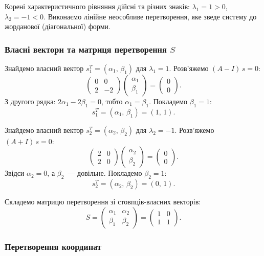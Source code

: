 \documentclass[12pt,a4paper]{article}
\begin{document}
Корені характеристичного рівняння дійсні та різних знаків: $\lambda_1 = 1 > 0$, $\lambda_2 = -1 < 0$. Виконаємо лінійне неособливе перетворення, яке зведе систему до жорданової (діагональної) форми.

\subsubsection{Власні вектори та матриця перетворення $S$}

Знайдемо власний вектор $s_1^T = (\alpha_1,\,\beta_1)$ для $\lambda_1 = 1$. Розв'яжемо $(A - I)\,s = 0$:
\[
\begin{pmatrix}
0 & 0\\
2 & -2
\end{pmatrix}
\begin{pmatrix}
\alpha_1\\\beta_1
\end{pmatrix}
=
\begin{pmatrix}
0\\0
\end{pmatrix}.
\]
З другого рядка: $2\alpha_1 - 2\beta_1 = 0$, тобто $\alpha_1 = \beta_1$. Покладемо $\beta_1 = 1$:
\[
s_1^T = (\alpha_1,\,\beta_1) = (1,\,1).
\]

Знайдемо власний вектор $s_2^T = (\alpha_2,\,\beta_2)$ для $\lambda_2 = -1$. Розв'яжемо $(A + I)\,s = 0$:
\[
\begin{pmatrix}
2 & 0\\
2 & 0
\end{pmatrix}
\begin{pmatrix}
\alpha_2\\\beta_2
\end{pmatrix}
=
\begin{pmatrix}
0\\0
\end{pmatrix}.
\]
Звідси $\alpha_2 = 0$, а $\beta_2$~--- довільне. Покладемо $\beta_2 = 1$:
\[
s_2^T = (\alpha_2,\,\beta_2) = (0,\,1).
\]

Складемо матрицю перетворення зі стовпців-власних векторів:
\[
S =
\begin{pmatrix}
\alpha_1 & \alpha_2\\
\beta_1 & \beta_2
\end{pmatrix}
=
\begin{pmatrix}
1 & 0\\
1 & 1
\end{pmatrix}.
\]

\subsubsection{Перетворення координат}
\end{document}
